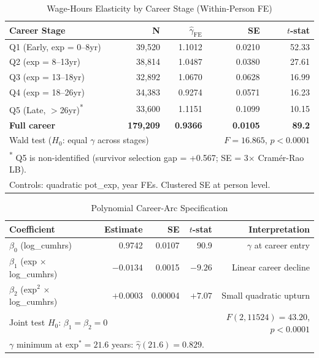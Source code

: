 \documentclass[11pt, letterpaper]{article}
\begin{document}
\begin{table}[h!]
\centering
\caption{Wage-Hours Elasticity by Career Stage (Within-Person FE)}
\label{tab:gamma_by_stage}
\begin{tabular}{lrrrr}
\toprule
Career Stage & N & $\hat{\gamma}_\text{FE}$ & SE & $t$-stat \\
\midrule
Q1 (Early, exp = 0--8yr) & 39,520 & 1.1012 & 0.0210 & 52.33 \\
Q2 (exp = 8--13yr) & 38,814 & 1.0487 & 0.0380 & 27.61 \\
Q3 (exp = 13--18yr) & 32,892 & 1.0670 & 0.0628 & 16.99 \\
Q4 (exp = 18--26yr) & 34,383 & 0.9274 & 0.0571 & 16.23 \\
Q5 (Late, $>$26yr)\textsuperscript{*} & 33,600 & 1.1151 & 0.1099 & 10.15 \\
\textbf{Full career} & \textbf{179,209} & \textbf{0.9366} & \textbf{0.0105} & \textbf{89.2} \\
\midrule
\multicolumn{3}{l}{Wald test ($H_0$: equal $\gamma$ across stages)} & \multicolumn{2}{r}{$F = 16.865$, $p < 0.0001$} \\
\bottomrule
\multicolumn{5}{l}{\footnotesize \textsuperscript{*} Q5 is non-identified (survivor selection gap = +0.567; SE = 3$\times$ Cramér-Rao LB).}\\
\multicolumn{5}{l}{\footnotesize Controls: quadratic pot\_exp, year FEs. Clustered SE at person level.}
\end{tabular}
\end{table}

\begin{table}[h!]
\centering
\caption{Polynomial Career-Arc Specification}
\label{tab:polynomial}
\begin{tabular}{lrrrr}
\toprule
Coefficient & Estimate & SE & $t$-stat & Interpretation \\
\midrule
$\beta_0$ (log\_cumhrs) & 0.9742 & 0.0107 & 90.9 & $\gamma$ at career entry \\
$\beta_1$ (exp $\times$ log\_cumhrs) & $-0.0134$ & 0.0015 & $-9.26$ & Linear career decline \\
$\beta_2$ (exp$^2$ $\times$ log\_cumhrs) & $+0.0003$ & 0.00004 & $+7.07$ & Small quadratic upturn \\
\midrule
\multicolumn{3}{l}{Joint test $H_0$: $\beta_1 = \beta_2 = 0$} & \multicolumn{2}{r}{$F(2,11524) = 43.20$, $p < 0.0001$} \\
\bottomrule
\multicolumn{5}{l}{\footnotesize $\gamma$ minimum at exp$^* = 21.6$ years: $\hat{\gamma}(21.6) = 0.829$.}
\end{tabular}
\end{table}
\end{document}
